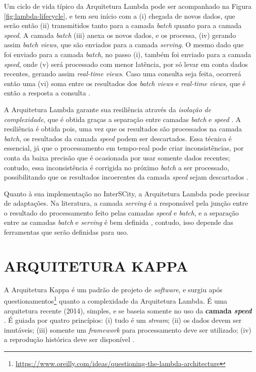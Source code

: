 Um ciclo de vida típico da Arquitetura Lambda pode ser acompanhado na Figura
\ref{fig:lambda-lifecycle}, e tem seu início com a (i) chegada
de novos dados, que serão então (ii) transmitidos tanto para a camada
\textit{batch} quanto para a camada \textit{speed}. A camada \textit{batch}
(iii) anexa os novos dados, e os processa, (iv) gerando assim
\textit{batch views}, que são enviados para a camada \textit{serving}. O mesmo
dado que foi enviado para a camada \textit{batch}, no passo (i), também foi
enviado para a camada \textit{speed}, onde (v) será processado com menor latência,
por só levar em conta dados recentes, gerando assim \textit{real-time views}. 
Caso uma consulta seja feita, ocorrerá então uma (vi) soma entre os resultados
dos \textit{batch views} e \textit{real-time views}, que é então a resposta
a consulta \cite{marz2015}.

A Arquitetura Lambda garante sua resiliência através da \textit{isolação de
complexidade}, que é obtida graças a separação entre camadas \textit{batch}
e \textit{speed} \cite{marz2015}. A resiliência é obtida pois, uma vez que os
resultados são processados na camada \textit{batch}, os resultados da camada
\textit{speed} podem ser descartados. Essa técnica é essencial, já que o
processamento em tempo-real pode criar inconsistências, por conta da baixa
precisão que é ocasionada por usar somente dados recentes; contudo, essa
inconsistência é corrigida no próximo \textit{batch} a ser processado,
possibilitando que os resultados incoerentes da camada \textit{speed} sejam
descartados \cite{marz2015}.

Quanto à sua implementação no InterSCity, a Arquitetura Lambda pode precisar de
adaptações. Na literatura, a camada \textit{serving} é a responsável pela
junção entre o resultado do processamento feito pelas camadas \textit{speed} e
\textit{batch}, e a separação entre as camadas \textit{batch} e \textit{serving}
é bem definida \cite{marz2015}, contudo, isso depende das ferramentas que
serão definidas para uso. 

\section{ARQUITETURA KAPPA}

A Arquitetura Kappa é um padrão de projeto de \textit{software}, e surgiu após
questionamentos\footnote{\url{https://www.oreilly.com/ideas/questioning-the-lambda-architecture}}
quanto a complexidade da Arquitetura Lambda. É uma arquitetura recente (2014),
simples, e se baseia somente no uso da \textbf{camada \textit{speed}}
\cite{seyvet2016}. É guiada por quatro princípios:
(i) tudo é um \textit{stream}; (ii) os dados devem ser imutáveis; (iii)
somente um \textit{framework} para processamento deve ser utilizado; (iv) a
reprodução histórica deve ser disponível \cite{seyvet2016}.

